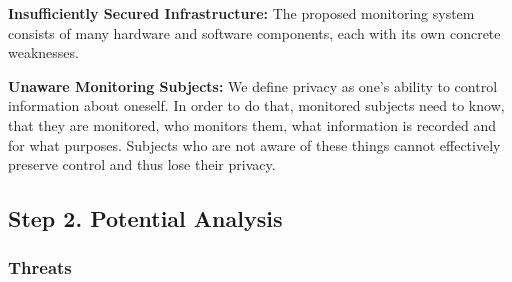 \textbf{Insufficiently Secured Infrastructure:}
The proposed monitoring system consists of many hardware and software components, each with its own concrete weaknesses.


\textbf{Unaware Monitoring Subjects:}
We define privacy as one's ability to control information about oneself. 
In order to do that, monitored subjects need to know, that they are monitored, who monitors them, what information is recorded and for what purposes.
Subjects who are not aware of these things cannot effectively preserve control and thus lose their privacy.




%
%
%

\subsection{Step 2. Potential Analysis}

\subsubsection{Threats}

